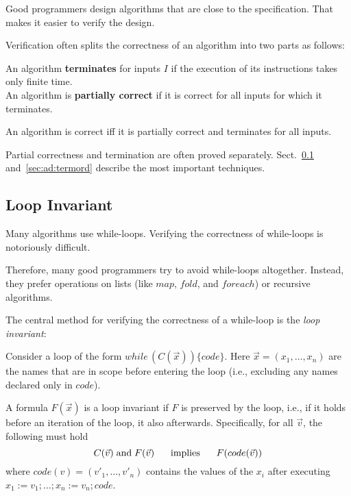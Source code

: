 Good programmers design algorithms that are close to the specification.
That makes it easier to verify the design.

Verification often splits the correctness of an algorithm into two parts as follows:

\begin{definition}
An algorithm \textbf{terminates} for inputs $I$ if the execution of its instructions takes only finite time.\\
An algorithm is \textbf{partially correct} if it is correct for all inputs for which it terminates.
\end{definition}

\begin{theorem}
An algorithm is correct iff it is partially correct and terminates for all inputs.
\end{theorem}

Partial correctness and termination are often proved separately.
Sect.~\ref{sec:ad:loopinv} and~\ref{sec:ad:termord} describe the most important techniques.

\subsection{Loop Invariant}\label{sec:ad:loopinv}

Many algorithms use while-loops.
Verifying the correctness of while-loops is notoriously difficult.

Therefore, many good programmers try to avoid while-loops altogether.
Instead, they prefer operations on lists (like $map$, $fold$, and $foreach$) or recursive algorithms.
\medskip

The central method for verifying the correctness of a while-loop is the \emph{loop invariant}:

\begin{definition}\label{def:ad:loopinv}
Consider a loop of the form $while\,(C(\vec{x}))\{code\}$.
Here $\vec{x}=(x_1,\ldots,x_n)$ are the names that are in scope before entering the loop (i.e., excluding any names declared only in $code$).

A formula $F(\vec{x})$ is a loop invariant if $F$ is preserved by the loop, i.e., if it holds before an iteration of the loop, it also afterwards.
 Specifically, for all $\vec{v}$, the following must hold
   \[C(\vec{v}) \;\mathrm{and}\; F(\vec{v}) \hspace*{.5cm} \;\mathrm{implies}\;\hspace*{.5cm} F(code(\vec{v}))\]
   where $code(v)=(v'_1,\ldots,v'_n)$ contains the values of the $x_i$ after executing $x_1:=v_1; \ldots; x_n:=v_n; code$.
\end{definition}

